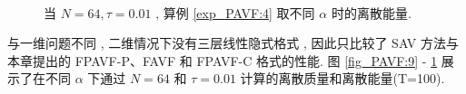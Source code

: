 \begin{figure}[H]
	\begin{center}
	\\
	\caption{当  $N = 64 , \tau=0.01$ , 算例 \ref{exp_PAVF:4} 取不同 $\alpha$ 时的离散能量.}
	\label{fig_PAVF:10}
	\end{center}
	\end{figure}
	与一维问题不同 , 二维情况下没有三层线性隐式格式 , 因此只比较了 SAV 方法与本章提出的 FPAVF-P、FAVF 和 FPAVF-C 格式的性能.
	图 \ref{fig_PAVF:9} - \ref{fig_PAVF:10} 展示了在不同 $\alpha$ 下通过 $N=64$ 和 $\tau=0.01$ 计算的离散质量和离散能量(T=100).
